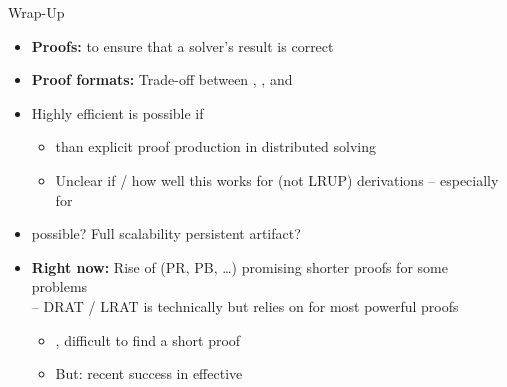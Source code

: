 \documentclass[t,english]{sdqbeamer}
\begin{document}
\begin{frame}{Wrap-Up}
	\begin{itemize}
		\item \textbf{Proofs:}  to ensure that a solver's result is correct
		\item \textbf{Proof formats:} Trade-off between , , and 
		\pause
		\vspace*{2mm}
		\item Highly efficient  is possible if 
		\begin{itemize}
			\item {} than explicit proof production in distributed solving
			\item Unclear if / how well this works for  (not LRUP) derivations -- especially for 
		\end{itemize}
		\item {} possible? Full scalability  persistent artifact?
		\pause
		\item \textbf{Right now:} Rise of  (PR, PB, \ldots) promising shorter proofs for some problems~\cite{balyo2023proceedings}
		\\[1mm]-- DRAT / LRAT is technically  but relies on  for most powerful proofs
		\begin{itemize}
			\item {}, difficult to find a short proof
			\item But: recent success in effective ~\cite{haberlandt2023effective}
		\end{itemize}
	\end{itemize}
\end{frame}
\end{document}
